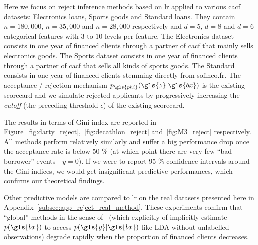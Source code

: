 Here we focus on reject inference methods based on \gls{lr} applied to various \gls{cacf} datasets: Electronics loans, Sports goods and Standard loans. They contain $n=180{,}000$, $n=35{,}000$ and $n=28{,}000$ respectively and $d=5$, $d=8$ and $d=6$ categorical features with $3$ to $10$ levels per feature. The Electronics dataset consists in one year of financed clients through a partner of \gls{cacf} that mainly sells electronics goods. The Sports dataset consists in one year of financed clients through a partner of \gls{cacf} that sells all kinds of sports goods. The Standard consists in one year of financed clients stemming directly from sofinco.fr. The acceptance / rejection mechanism $p_{\gls{phi}}(\gls{z} | \gls{bx})$ is the existing scorecard and we simulate rejected applicants by progressively increasing the \textit{cutoff} (the preceding threshold $\epsilon$) of the existing scorecard.

The results in terms of Gini index are reported in Figure~\ref{fig:darty_reject},~\ref{fig:decathlon_reject} and~\ref{fig:M3_reject} respectively. All methods perform relatively similarly and suffer a big performance drop once the acceptance rate is below 50 \% (at which point there are very few ``bad borrower'' events - $y = 0$). If we were to report 95 \% confidence intervals around the Gini indices, we would get insignificant predictive performances, which confirms our theoretical findings.

Other predictive models are compared to \gls{lr} on the real datasets presented here in Appendix~\ref{subsec:app_reject_real_method}. These experiments confirm that ``global'' methods in the sense of~\cite{zadrozny2004learning} (which explicitly of implicitly estimate $p(\gls{bx})$ to access $p(\gls{y} | \gls{bx})$ like LDA without unlabelled observations) degrade rapidly when the proportion of financed clients decreases.


